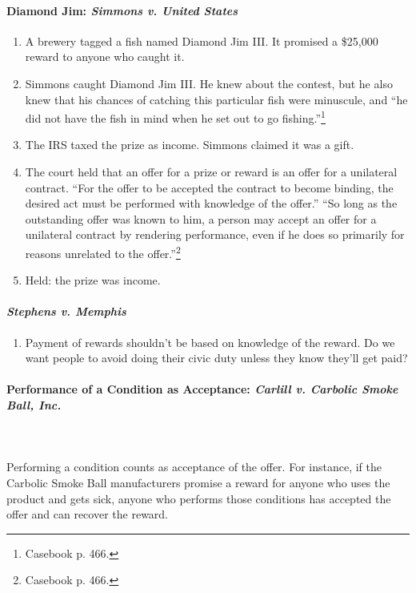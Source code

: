 \paragraph{Diamond Jim: \emph{Simmons v. United States}}

\begin{enumerate}
    \item A brewery tagged a fish named Diamond Jim III. It promised a 
    \$25,000 reward to anyone who caught it.
    \item Simmons caught Diamond Jim III. He knew about the contest, but he 
    also knew that his chances of catching this particular fish were 
    minuscule, and ``he did not have the fish in mind when he set out to go 
    fishing.''\footnote{Casebook p. 466.}
    \item The IRS taxed the prize as income. Simmons claimed it was a gift.
    \item The court held that an offer for a prize or reward is an offer for a 
    unilateral contract. ``For the offer to be accepted the contract to become 
    binding, the desired act must be performed with knowledge of the 
    offer.'' ``So long as the outstanding offer was known to him, a person may 
    accept an offer for a unilateral contract by rendering performance, even 
    if he does so primarily for reasons unrelated to the 
    offer.''\footnote{Casebook p. 466.}
    \item Held: the prize was income.
\end{enumerate}

\paragraph{\emph{Stephens v. Memphis}}

\begin{enumerate}
    \item Payment of rewards shouldn't be based on knowledge of the reward. Do 
    we want people to avoid doing their civic duty unless they know they'll 
    get paid?
\end{enumerate}

\paragraph{Performance of a Condition as Acceptance: \emph{Carlill v. Carbolic 
Smoke Ball, Inc.}}
~\\\\
Performing a condition counts as acceptance of the offer. For 
instance, if the Carbolic Smoke Ball manufacturers promise a reward for anyone 
who uses the product and gets sick, anyone who performs those conditions has 
accepted the offer and can recover the reward.

